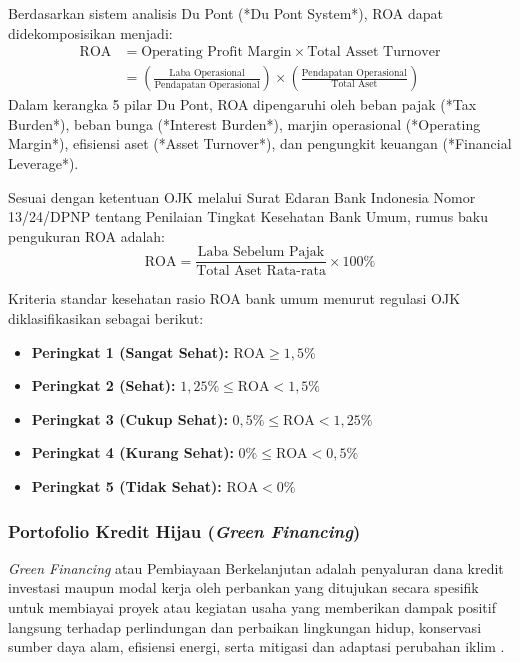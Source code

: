\documentclass[12pt,a4paper]{article}
\numberwithin{equation}{section}
\begin{document}
\noindent
Berdasarkan sistem analisis Du Pont (*Du Pont System*), ROA dapat didekomposisikan menjadi:
\begin{equation}
\begin{split}
  \text{ROA} &= \text{Operating Profit Margin} \times \text{Total Asset Turnover} \\
             &= \left(\frac{\text{Laba Operasional}}{\text{Pendapatan Operasional}}\right) \times \left(\frac{\text{Pendapatan Operasional}}{\text{Total Aset}}\right)
\end{split}
\end{equation}
Dalam kerangka 5 pilar Du Pont, ROA dipengaruhi oleh beban pajak (*Tax Burden*), beban bunga (*Interest Burden*), marjin operasional (*Operating Margin*), efisiensi aset (*Asset Turnover*), dan pengungkit keuangan (*Financial Leverage*).

\noindent
Sesuai dengan ketentuan OJK melalui Surat Edaran Bank Indonesia Nomor 13/24/DPNP tentang Penilaian Tingkat Kesehatan Bank Umum, rumus baku pengukuran ROA adalah:
\begin{equation}
  \text{ROA} = \frac{\text{Laba Sebelum Pajak}}{\text{Total Aset Rata-rata}} \times 100\%
\end{equation}

\noindent
Kriteria standar kesehatan rasio ROA bank umum menurut regulasi OJK diklasifikasikan sebagai berikut:
\begin{itemize}
  \item \textbf{Peringkat 1 (Sangat Sehat):} $\text{ROA} \ge 1{,}5\%$
  \item \textbf{Peringkat 2 (Sehat):} $1{,}25\% \le \text{ROA} < 1{,}5\%$
  \item \textbf{Peringkat 3 (Cukup Sehat):} $0{,}5\% \le \text{ROA} < 1{,}25\%$
  \item \textbf{Peringkat 4 (Kurang Sehat):} $0\% \le \text{ROA} < 0{,}5\%$
  \item \textbf{Peringkat 5 (Tidak Sehat):} $\text{ROA} < 0\%$
\end{itemize}

\subsubsection{Portofolio Kredit Hijau (\emph{Green Financing})}
\noindent
\emph{Green Financing} atau Pembiayaan Berkelanjutan adalah penyaluran dana kredit investasi maupun modal kerja oleh perbankan yang ditujukan secara spesifik untuk membiayai proyek atau kegiatan usaha yang memberikan dampak positif langsung terhadap perlindungan dan perbaikan lingkungan hidup, konservasi sumber daya alam, efisiensi energi, serta mitigasi dan adaptasi perubahan iklim \citep{OJK2017, Cui2018}.
\end{document}
